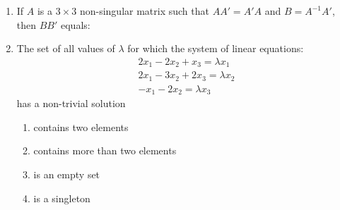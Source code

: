 \documentclass[journal,12pt,twocolumn]{IEEEtran}
\theoremstyle{remark}
\begin{document}
\begin{enumerate}
	\item If $A$ is a $3\times3$ non-singular matrix such that $AA'=A'A$ and $B=A^{-1}A'$, then $BB'$ equals:%
	\newline
	\hfill{}
        \begin{enumerate}[label={(\alph*)}]
        \end{enumerate}


    \item The set of all values of $\lambda$ for which the system of linear equations:
	\begin{align*}
		2x_1-2x_2+x_3 = \lambda x_1\\
		2x_1-3x_2+2x_3 = \lambda x_2\\
		-x_1-2x_2= \lambda x_3
	\end{align*}
	has a non-trivial solution

	\hfill{}
	\begin{enumerate}[label={(\alph*)}]
		\item contains two elements
		\item contains more than two elements
		\item is an empty set
		\item is a singleton
	\end{enumerate}





\end{enumerate}
\end{document}
